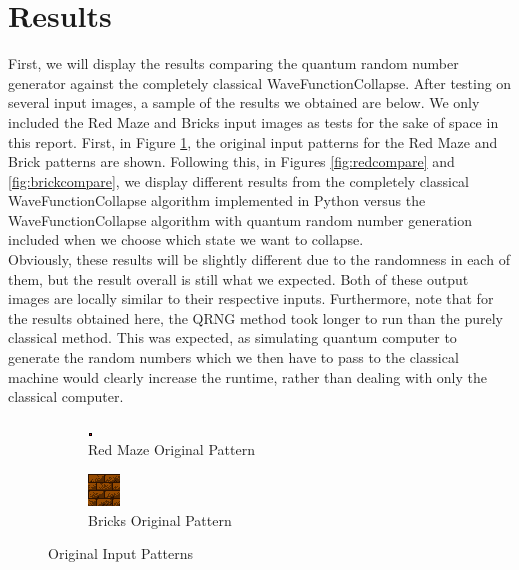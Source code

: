 \documentclass[10pt]{article}
\begin{document}
\newpage
\section{Results}
First, we will display the results comparing the quantum random number generator against the completely classical WaveFunctionCollapse. After testing on several input images, a sample of the results we obtained are below. We only included the Red Maze and Bricks input images as tests for the sake of space in this report. First, in Figure \ref{fig:oginput}, the original input patterns for the Red Maze and Brick patterns are shown. Following this, in Figures \ref{fig:redcompare} and \ref{fig:brickcompare}, we display different results from the completely classical WaveFunctionCollapse algorithm implemented in Python versus the WaveFunctionCollapse algorithm with quantum random number generation included when we choose which state we want to collapse.\\
\indent Obviously, these results will be slightly different due to the randomness in each of them, but the result overall is still what we expected. Both of these output images are locally similar to their respective inputs. Furthermore, note that for the results obtained here, the QRNG method took longer to run than the purely classical method. This was expected, as simulating quantum computer to generate the random numbers which we then have to pass to the classical machine would clearly increase the runtime, rather than dealing with only the classical computer.

\begin{figure}[h]
\centering
\begin{subfigure}{.5\textwidth}
  \centering
  \includegraphics[scale=5]{RedMaze}
  \caption{Red Maze Original Pattern}
\end{subfigure}%
\begin{subfigure}{.5\textwidth}
  \centering
  \includegraphics[scale=1]{3Bricks}
  \caption{Bricks Original Pattern}
\end{subfigure}
\caption{Original Input Patterns}
\label{fig:oginput}
\end{figure}
\end{document}
